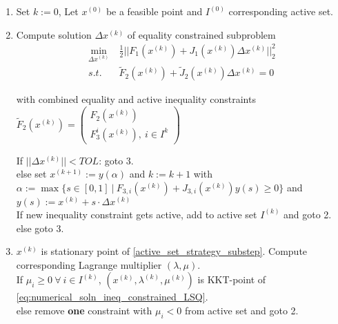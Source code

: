 \documentclass{scrartcl}[12pt, halfparskip]
\numberwithin{equation}{section}
\numberwithin{figure}{section}
\numberwithin{table}{section}
\begin{document}
\begin{enumerate}
	\item Set $k := 0$, Let $x^{(0)}$ be a feasible point and $I^{(0)}$ corresponding active set.
	\item Compute solution $\Delta x^{(k)}$ of equality constrained subproblem
	\begin{align}
	\min_{\Delta x^{(k)}} & \ \frac{1}{2} || F_1(x^{(k)}) + J_1(x^{(k)}) \Delta x^{(k)} ||_2^2 \nonumber \\
	s.t. & \ \tilde{F}_2(x^{(k)}) + \tilde{J}_2(x^{(k)}) \Delta x^{(k)} = 0
	\label{active_set_strategy_substep}
	\end{align}
	
	with combined equality and active inequality constraints $\tilde{F}_2(x^{(k)}) = 
	\begin{pmatrix} 
	F_2(x^{(k)}) \\  
	F_3^i(x^{(k)}), \ i \in I^k
	\end{pmatrix}$
	
	If $||\Delta x^{(k)}|| < TOL$: goto 3. \\
	\textcolor{white}{\quad}else set $x^{(k+1)} := y(\alpha)$ and $k := k+1$ with \\
	\textcolor{white}{\qquad}$\alpha := \max\{ s \in [0,1] \ | \ F_{3,i}(x^{(k)}) + J_{3,i}(x^{(k)}) y(s) \ge 0 \}$ and \\
	\textcolor{white}{\qquad}$y(s) := x^{(k)} + s \cdot \Delta x^{(k)}$ \\
	
	If new inequality constraint gets active, add to active set $I^{(k)}$ and goto 2. \\
	\textcolor{white}{\quad}else goto 3.
	
	\item $x^{(k)}$ is stationary point of \cref{active_set_strategy_substep}. Compute corresponding Lagrange multiplier $(\lambda, \mu)$. \\
	If $\mu_i \ge 0 \ \forall \ i \in I^{(k)}$, $(x^{(k)},\lambda^{(k)},\mu^{(k)})$ is KKT-point of \cref{eq:numerical_soln_ineq_constrained_LSQ}. \\
	\textcolor{white}{\quad}else remove \textbf{one} constraint with $\mu_i < 0$ from active set and goto 2.
	
\end{enumerate}
\end{document}
